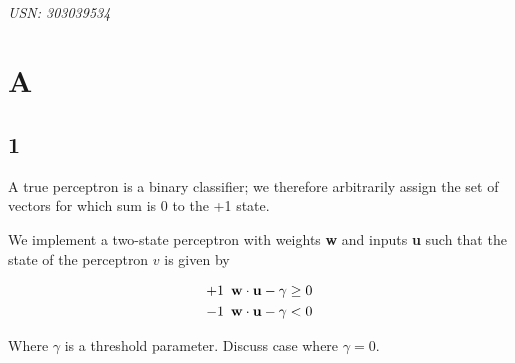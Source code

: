 \documentclass{article}
\begin{document}

\begin{center}
\textbf{\LARGE{}}\\

\textit{USN: 303039534}\\
\end{center}

\section*{A}

\subsection*{1}

A true perceptron is a binary classifier; we therefore arbitrarily assign the set of vectors for which sum is 0 to the +1 state.

We implement a two-state perceptron with weights \textbf{w} and inputs \textbf{u} such that the state of the perceptron $v$ is given by

\begin{equation}
\begin{split}
+1 \,\,\, {\bf w \cdot u} - \gamma \geq 0 \\
-1 \,\,\, {\bf w \cdot u} - \gamma < 0
\end{split}
\end{equation}

Where $\gamma$ is a threshold parameter. Discuss case where $\gamma = 0$.
\end{document}

